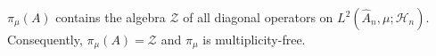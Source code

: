 $\pi_\mu(A)$ contains the algebra $\mathcal{Z}$ of all diagonal operators on $L^2(\hat{A}_n, \mu; \mathcal{H}_n)$. Consequently, $\pi_\mu(A) = \mathcal{Z}$ and $\pi_\mu$ is multiplicity-free.
